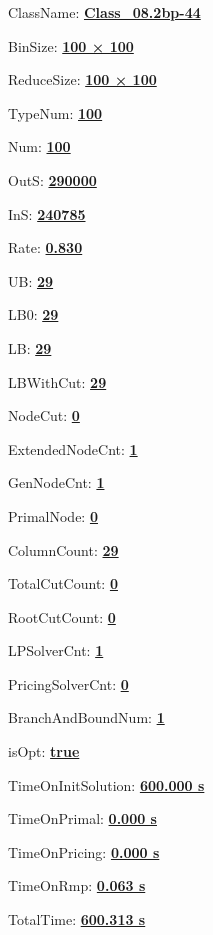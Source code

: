 \documentclass[11pt]{article}
\begin{document}
\pagestyle{empty}


ClassName: \underline{\textbf{Class_08.2bp-44}}
\par
BinSize: \underline{\textbf{100 × 100}}
\par
ReduceSize: \underline{\textbf{100 × 100}}
\par
TypeNum: \underline{\textbf{100}}
\par
Num: \underline{\textbf{100}}
\par
OutS: \underline{\textbf{290000}}
\par
InS: \underline{\textbf{240785}}
\par
Rate: \underline{\textbf{0.830}}
\par
UB: \underline{\textbf{29}}
\par
LB0: \underline{\textbf{29}}
\par
LB: \underline{\textbf{29}}
\par
LBWithCut: \underline{\textbf{29}}
\par
NodeCut: \underline{\textbf{0}}
\par
ExtendedNodeCnt: \underline{\textbf{1}}
\par
GenNodeCnt: \underline{\textbf{1}}
\par
PrimalNode: \underline{\textbf{0}}
\par
ColumnCount: \underline{\textbf{29}}
\par
TotalCutCount: \underline{\textbf{0}}
\par
RootCutCount: \underline{\textbf{0}}
\par
LPSolverCnt: \underline{\textbf{1}}
\par
PricingSolverCnt: \underline{\textbf{0}}
\par
BranchAndBoundNum: \underline{\textbf{1}}
\par
isOpt: \underline{\textbf{true}}
\par
TimeOnInitSolution: \underline{\textbf{600.000 s}}
\par
TimeOnPrimal: \underline{\textbf{0.000 s}}
\par
TimeOnPricing: \underline{\textbf{0.000 s}}
\par
TimeOnRmp: \underline{\textbf{0.063 s}}
\par
TotalTime: \underline{\textbf{600.313 s}}
\par
\newpage


\end{document}
